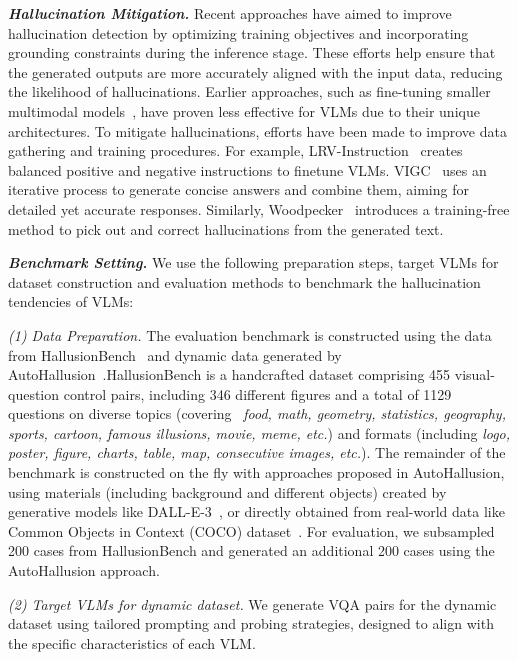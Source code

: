\textbf{\textit{Hallucination Mitigation.}}
Recent approaches have aimed to improve hallucination detection by optimizing training objectives and incorporating grounding constraints during the inference stage. These efforts help ensure that the generated outputs are more accurately aligned with the input data, reducing the likelihood of hallucinations.
Earlier approaches, such as fine-tuning smaller multimodal models~\cite{biten2022let,kim2023exposing}, have proven less effective for VLMs due to their unique architectures. To mitigate hallucinations, efforts have been made to improve data gathering and training procedures. For example, LRV-Instruction~\cite{liu2023aligning} creates balanced positive and negative instructions to finetune VLMs. VIGC~\cite{Wang2023VIGCVI} uses an iterative process to generate concise answers and combine them, aiming for detailed yet accurate responses. Similarly, Woodpecker~\cite{yin2023woodpecker} introduces a training-free method to pick out and correct hallucinations from the generated text.



\textbf{\textit{Benchmark Setting.}} We use the following preparation steps, target VLMs for dataset construction and evaluation methods to benchmark the hallucination tendencies of VLMs:

\noindent \textit{(1) Data Preparation.} The evaluation benchmark is constructed using the data from HallusionBench~\cite{HallusionBench} and dynamic data generated by AutoHallusion~\cite{AutoHallusion}.HallusionBench is a handcrafted dataset comprising 455 visual-question control pairs, including 346 different figures and a total of 1129 questions on diverse topics (covering \ \textit{{food, math, geometry, statistics, geography, sports, cartoon, famous illusions, movie, meme,} etc.}) and formats (including \textit{{logo, poster, figure, charts, table, map, consecutive images,} etc.}). 
The remainder of the benchmark is constructed on the fly with approaches proposed in AutoHallusion, using materials (including background and different objects) created by generative models like DALL-E-3~\cite{dalle3}, or directly obtained from real-world data like Common Objects in Context (COCO) dataset~\cite{lin2014microsoft}.
For evaluation, we subsampled 200 cases from HallusionBench and generated an additional 200 cases using the AutoHallusion approach.

\textit{(2) Target VLMs for dynamic dataset.} We generate VQA pairs for the dynamic dataset using tailored prompting and probing strategies, designed to align with the specific characteristics of each VLM. 

